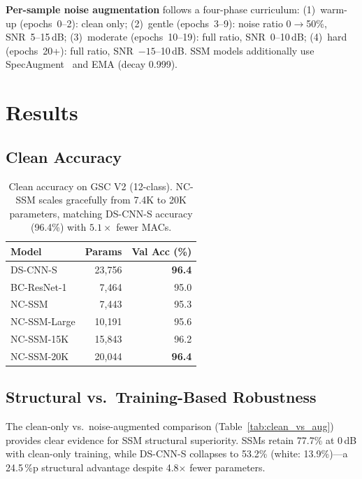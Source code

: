 \documentclass[journal]{IEEEtran}
\begin{document}
\textbf{Per-sample noise augmentation} follows a four-phase curriculum:
(1)~warm-up (epochs~0--2): clean only;
(2)~gentle (epochs~3--9): noise ratio 0$\to$50\%, SNR~5--15\,dB;
(3)~moderate (epochs~10--19): full ratio, SNR~0--10\,dB;
(4)~hard (epochs~20+): full ratio, SNR~$-15$--10\,dB.
SSM models additionally use SpecAugment~\cite{park2019specaugment} and EMA (decay 0.999).



\section{Results}
\label{sec:results}

\subsection{Clean Accuracy}

\begin{table}[t]
\centering
\caption{Clean accuracy on GSC V2 (12-class). NC-SSM scales gracefully from 7.4K to 20K parameters, matching DS-CNN-S accuracy (96.4\%) with $5.1\times$ fewer MACs.}
\label{tab:clean}
\small
\begin{tabular}{lrr}
\toprule
\textbf{Model} & \textbf{Params} & \textbf{Val Acc (\%)} \\
\midrule
DS-CNN-S & 23{,}756 & \textbf{96.4} \\
BC-ResNet-1 & 7{,}464 & 95.0 \\
\midrule
NC-SSM & 7{,}443 & 95.3 \\
NC-SSM-Large & 10{,}191 & 95.6 \\
NC-SSM-15K & 15{,}843 & 96.2 \\
NC-SSM-20K & 20{,}044 & \textbf{96.4} \\
\bottomrule
\end{tabular}
\end{table}


\subsection{Structural vs.\ Training-Based Robustness}
\label{sec:struct_vs_train}

The clean-only vs.\ noise-augmented comparison (Table~\ref{tab:clean_vs_aug}) provides clear evidence for SSM structural superiority.
SSMs retain 77.7\% at 0\,dB with clean-only training, while DS-CNN-S collapses to 53.2\% (white: 13.9\%)---a 24.5\,\%p structural advantage despite 4.8$\times$ fewer parameters.
\end{document}

